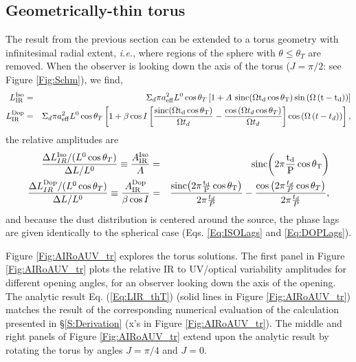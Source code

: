  
\subsection{Geometrically-thin torus} 
\label{S:Interp:ThinTor}

The result from the previous section can be extended to a torus geometry with
infinitesimal radial extent, \textit{i.e.}, where regions of the sphere with
$\theta \leq \theta_T$ are removed. When the observer is looking down the axis
of the torus ($J=\pi/2$: see Figure \ref{Fig:Schm}), we find,
\begin{eqnarray}
L^{\rm{Iso}}_{\rm{IR}} &=&  \Sigma_d \pi  a^2_{\rm{eff}} L^0  \cos{\theta_T} \left[ 
  1 +  A  \ \rm{sinc}{\left( \Omega t_d \cos{\theta_T}\right)}  \sin{ \left( \Omega \left( t - t_d \right) \right)  }
   \right] \nonumber \\
L^{\rm{Dop}}_{\rm{IR}} &=&  \Sigma_d \pi  a^2_{\rm{eff}} L^0 \cos{\theta_T} \left[ 
  1 +  \beta \cos{I}  \left[ \frac{    \rm{sinc}{ \left( \Omega t_d  \cos{\theta_T} \right)  }    }{\Omega t_d} 
  -  \frac{\cos{ \left(\Omega t_d  \cos{\theta_T} \right)}}{\Omega t_d }  \right] \cos{\left( \Omega \left( t - t_d \right) \right)}
   \right] ,
   \label{Eq:LIR_thT}
\end{eqnarray}
the relative amplitudes are 
\begin{eqnarray}
\frac{\Delta L^{\rm{Iso}}_{IR}/(L^0 \cos{\theta_T})}{\Delta L /L^0} \equiv \frac{A^{\rm{Iso}}_{\rm{IR}}}{A} &=&  \rm{sinc}{\left( 2 \pi \frac{t_d}{P} \cos{\theta_T} \right)}  \nonumber \\
\frac{\Delta L^{\rm{Dop}}_{IR}/(L^0 \cos{\theta_T})}{\Delta L /L^0} \equiv \frac{A^{\rm{Dop}}_{\rm{IR}}}{\beta \cos{I}}  &=&  \frac{ \rm{sinc}{ \left( 2 \pi \frac{t_d}{P} \cos{\theta_T} \right)  }    }{2 \pi \frac{t_d}{P}} -  \frac{ \cos{ \left(2 \pi \frac{t_d}{P} \cos{\theta_T} \right) } }{ 2 \pi \frac{t_d}{P} },
   \label{Eq:AIR_thT}
\end{eqnarray}
and because the dust distribution is centered around the source, the phase
lags are given identically to the spherical case (Eqs. \ref{Eq:ISOLags} and
\ref{Eq:DOPLags}).






Figure \ref{Fig:AIRoAUV_tr} explores the torus solutions. The first panel in
Figure \ref{Fig:AIRoAUV_tr} plots the relative IR to UV/optical variability
amplitudes for different opening angles, for an observer looking down the axis
of the opening. The analytic result Eq. (\ref{Eq:LIR_thT}) (solid lines in
Figure \ref{Fig:AIRoAUV_tr}) matches the result of the corresponding numerical
evaluation of the calculation presented in \S \ref{S:Derivation} (x's in
Figure \ref{Fig:AIRoAUV_tr}). The middle and right panels of Figure
\ref{Fig:AIRoAUV_tr} extend upon the analytic result by rotating the torus by
angles $J=\pi/4$ and $J=0$.

